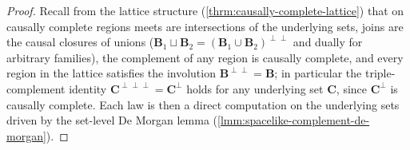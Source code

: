\begin{proof}
    \leanok
    Recall from the lattice structure (\ref{thrm:causally-complete-lattice}) that on causally complete regions meets are intersections of the underlying sets, joins are the causal closures of unions ($\mathbf{B}_1 \sqcup \mathbf{B}_2 = (\mathbf{B}_1 \cup \mathbf{B}_2)^{\perp\perp}$ and dually for arbitrary families), the complement of any region is causally complete, and every region in the lattice satisfies the involution $\mathbf{B}^{\perp\perp} = \mathbf{B}$; in particular the triple-complement identity $\mathbf{C}^{\perp\perp\perp} = \mathbf{C}^\perp$ holds for any underlying set $\mathbf{C}$, since $\mathbf{C}^\perp$ is causally complete. Each law is then a direct computation on the underlying sets driven by the set-level De Morgan lemma (\ref{lmm:spacelike-complement-de-morgan}).


\end{proof}
